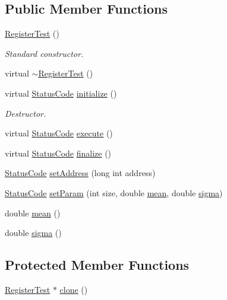 \subsection*{Public Member Functions}
\begin{DoxyCompactItemize}
\item 
\hyperlink{classRegisterTest_a0c77058c104d6249d884d864a4f61524}{Register\+Test} ()
\begin{DoxyCompactList}\small\item\em Standard constructor. \end{DoxyCompactList}\item 
virtual \hyperlink{classRegisterTest_aa52cee0f106fabf76ee320c391ec94a2}{$\sim$\+Register\+Test} ()
\item 
virtual \hyperlink{classStatusCode}{Status\+Code} \hyperlink{classRegisterTest_a77354dcd379c33deae6b713a1ba697b5}{initialize} ()
\begin{DoxyCompactList}\small\item\em Destructor. \end{DoxyCompactList}\item 
virtual \hyperlink{classStatusCode}{Status\+Code} \hyperlink{classRegisterTest_aa1a19b0cd0e0f2d8a47913521ae259a4}{execute} ()
\item 
virtual \hyperlink{classStatusCode}{Status\+Code} \hyperlink{classRegisterTest_a6d37b30d3e663c99f7deef01310bea76}{finalize} ()
\item 
\hyperlink{classStatusCode}{Status\+Code} \hyperlink{classRegisterTest_a5ed3012183069fb4c76580efcf4cec3a}{set\+Address} (long int address)
\item 
\hyperlink{classStatusCode}{Status\+Code} \hyperlink{classRegisterTest_ac2c7c3721a238161d300bf1df5ffb1a5}{set\+Param} (int size, double \hyperlink{classRegisterTest_a5d3726a88a7fdcd90981bb5de8399df9}{mean}, double \hyperlink{classRegisterTest_af2a1f9ac2798188e52198fc264ae55cc}{sigma})
\item 
double \hyperlink{classRegisterTest_a5d3726a88a7fdcd90981bb5de8399df9}{mean} ()
\item 
double \hyperlink{classRegisterTest_af2a1f9ac2798188e52198fc264ae55cc}{sigma} ()
\end{DoxyCompactItemize}
\subsection*{Protected Member Functions}
\begin{DoxyCompactItemize}
\item 
\hyperlink{classRegisterTest}{Register\+Test} $\ast$ \hyperlink{classRegisterTest_a05c7318198562df874c8d7ab5d0e9f89}{clone} ()
\end{DoxyCompactItemize}
